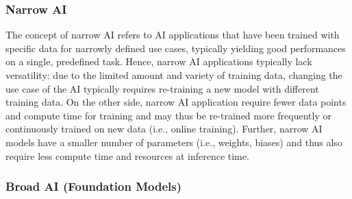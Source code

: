 
\subsubsection{Narrow AI}

The concept of narrow AI refers to AI applications that have been trained with specific data for narrowly defined use
cases, typically yielding good performances on a single, predefined task. Hence, narrow AI applications typically lack
versatility: due to the limited amount and variety of training data, changing the use case of the AI typically
requires re-training a new model with different training data. On the other side, narrow AI application require fewer
data points and compute time for training and may thus be re-trained more frequently or continuously trained on new data
(i.e., online training). Further, narrow AI models have a smaller number of parameters (i.e., weights, biases) and
thus also require less compute time and resources at inference time.

\subsubsection{Broad AI (Foundation Models)}

